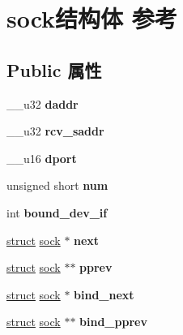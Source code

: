 \hypertarget{structsock}{}\section{sock结构体 参考}
\label{structsock}
\subsection*{Public 属性}
\begin{DoxyCompactItemize}
\item 
\mbox{\label{structsock_af26a94c93080134072a2644959aa6c71}} 
\+\_\+\+\_\+u32 {\bfseries daddr}
\item 
\mbox{\label{structsock_a4be25874d1c3b25cb63a3f87f754cb56}} 
\+\_\+\+\_\+u32 {\bfseries rcv\+\_\+saddr}
\item 
\mbox{\label{structsock_a8a384e0e1c481bcb3fa98725f28ca326}} 
\+\_\+\+\_\+u16 {\bfseries dport}
\item 
\mbox{\label{structsock_aaa0ef20a19dc6d311e93d39ff685d117}} 
unsigned short {\bfseries num}
\item 
\mbox{\label{structsock_a9125476081a8a44ec8cf8336ad8c6127}} 
int {\bfseries bound\+\_\+dev\+\_\+if}
\item 
\mbox{\label{structsock_a1cfb106cedbc6686bbe6d3580d360bcf}} 
\hyperlink{interfacestruct}{struct} \hyperlink{structsock}{sock} $\ast$ {\bfseries next}
\item 
\mbox{\label{structsock_ac688e4e2d96f8033b5a25228e7c665a8}} 
\hyperlink{interfacestruct}{struct} \hyperlink{structsock}{sock} $\ast$$\ast$ {\bfseries pprev}
\item 
\mbox{\label{structsock_adeb4690c2ee6da263d8a6d7b6d00bf5d}} 
\hyperlink{interfacestruct}{struct} \hyperlink{structsock}{sock} $\ast$ {\bfseries bind\+\_\+next}
\item 
\mbox{\label{structsock_a306fdca10e74d487bbb5fa730d3ce7d7}} 
\hyperlink{interfacestruct}{struct} \hyperlink{structsock}{sock} $\ast$$\ast$ {\bfseries bind\+\_\+pprev}
\item 

\end{DoxyCompactItemize}
